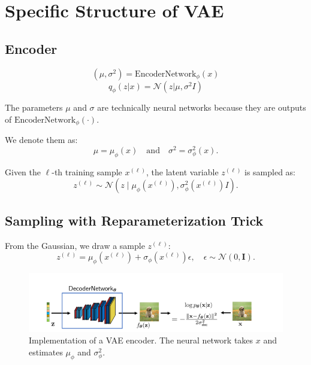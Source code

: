 
\section{Specific Structure of VAE}

\subsection{Encoder}

\[
(\mu, \sigma^2) = \text{EncoderNetwork}_\phi(x)
\]
\[
q_\phi(z|x) = \mathcal{N}(z | \mu, \sigma^2 I)
\]

The parameters \( \mu \) and \( \sigma \) are technically neural networks because they are outputs of \( \text{EncoderNetwork}_\phi(\cdot) \).

\vspace{0.3cm}

We denote them as:
\[
\mu = \mu_\phi(x) \quad \text{and} \quad \sigma^2 = \sigma^2_\phi(x).
\]

Given the \(\ell\)-th training sample \( x^{(\ell)} \), the latent variable \( z^{(\ell)} \) is sampled as:
\[
z^{(\ell)} \sim \mathcal{N} \left( z \mid \mu_\phi(x^{(\ell)}), \sigma^2_\phi(x^{(\ell)})I \right).
\]

\subsection{Sampling with Reparameterization Trick}

From the Gaussian, we draw a sample \( z^{(\ell)} \):
\[
z^{(\ell)} = \mu_\phi(x^{(\ell)}) + \sigma_\phi(x^{(\ell)}) \epsilon, \quad \epsilon \sim \mathcal{N}(0, \textbf{I}).
\]
\begin{figure}
    \centering
    \includegraphics[width=1\linewidth]{sec/anh02.png}
    \caption{Implementation of a VAE encoder. The neural network takes \( x \) and estimates \( \mu_\phi \) and \( \sigma^2_\phi \).}
    \label{fig:vae_encoder}
\end{figure}

